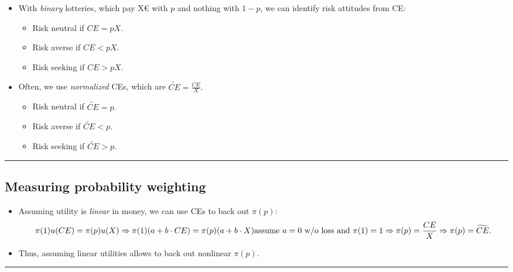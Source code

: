 \documentclass[
  letterpaper,
  DIV=11,
  numbers=noendperiod]{scrartcl}
\providecommand{\tightlist}{%
  \setlength{\itemsep}{0pt}\setlength{\parskip}{0pt}}\usepackage{longtable,booktabs,array}
\begin{document}
\begin{itemize}
\tightlist
\item
  With \emph{binary} lotteries, which pay X€ with \(p\) and nothing with
  \(1-p\), we can identify risk attitudes from CE:

  \begin{itemize}
  \tightlist
  \item
    Risk neutral if \(CE = p X.\)
  \item
    Risk averse if \(CE < p X.\)
  \item
    Risk seeking if \(CE > p X.\)
  \end{itemize}
\item
  Often, we use \emph{normalized} CEs, which are
  \(\widetilde{CE} = \frac{CE}{X}.\)

  \begin{itemize}
  \tightlist
  \item
    Risk neutral if \(\widetilde{CE} = p.\)
  \item
    Risk averse if \(\widetilde{CE} < p.\)
  \item
    Risk seeking if \(\widetilde{CE} > p.\)
  \end{itemize}
\end{itemize}

\begin{center}\rule{0.5\linewidth}{0.5pt}\end{center}

\subsection{Measuring probability
weighting}\label{measuring-probability-weighting-2}

\begin{itemize}
\tightlist
\item
  Assuming utility is \emph{linear} in money, we can use CEs to back out
  \(\pi(p)\): \[
  \pi(1)u(CE) = \pi(p)u(X) \Rightarrow \pi(1)(a + b\cdot CE) = \pi(p)(a + b\cdot X) \\
  \text{assume }a=0 \text{ w/o loss and }\pi(1) = 1\\ 
  \Rightarrow 
  \pi(p) = \frac{CE}{X} \Rightarrow \pi(p)  = \widetilde{CE}.
  \]
\item
  Thus, assuming linear utilities allows to back out nonlinear
  \(\pi(p)\).
\end{itemize}

\begin{center}\rule{0.5\linewidth}{0.5pt}\end{center}
\end{document}
